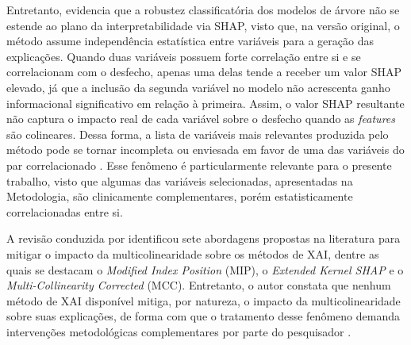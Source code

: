 Entretanto, \textcite{Salih2024} evidencia que a robustez classificatória dos modelos de árvore não se estende ao plano da interpretabilidade via SHAP, visto que, na versão original, o método assume independência estatística entre variáveis para a geração das explicações. Quando duas variáveis possuem forte correlação entre si e se correlacionam com o desfecho, apenas uma delas tende a receber um valor SHAP elevado, já que a inclusão da segunda variável no modelo não acrescenta ganho informacional significativo em relação à primeira. Assim, o valor SHAP resultante não captura o impacto real de cada variável sobre o desfecho quando as \textit{features} são colineares. Dessa forma, a lista de variáveis mais relevantes produzida pelo método pode se tornar incompleta ou enviesada em favor de uma das variáveis do par correlacionado \cite{Salih2024}. Esse fenômeno é particularmente relevante para o presente trabalho, visto que algumas das variáveis selecionadas, apresentadas na Metodologia, são clinicamente complementares, porém estatisticamente correlacionadas entre si. 

A revisão conduzida por \textcite{Salih2024} identificou sete abordagens propostas na literatura para mitigar o impacto da multicolinearidade sobre os métodos de XAI, dentre as quais se destacam o \textit{Modified Index Position} (MIP), o \textit{Extended Kernel SHAP} e o \textit{Multi-Collinearity Corrected} (MCC). Entretanto, o autor constata que nenhum método de XAI disponível mitiga, por natureza, o impacto da multicolinearidade sobre suas explicações, de forma com que o tratamento desse fenômeno demanda intervenções metodológicas complementares por parte do pesquisador \cite{Salih2024}.

